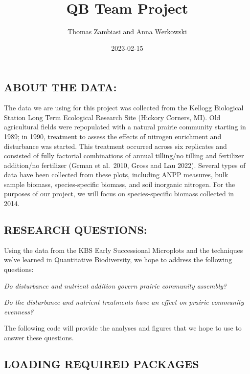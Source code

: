 \documentclass[
]{article}
\title{QB Team Project}
\author{Thomas Zambiasi and Anna Werkowski}
\date{2023-02-15}
\begin{document}
\maketitle

\hypertarget{about-the-data}{%
\subsection{ABOUT THE DATA:}\label{about-the-data}}

The data we are using for this project was collected from the Kellogg
Biological Station Long Term Ecological Research Site (Hickory Corners,
MI). Old agricultural fields were repopulated with a natural prairie
community starting in 1989; in 1990, treatment to assess the effects of
nitrogen enrichment and disturbance was started. This treatment occurred
across six replicates and consisted of fully factorial combinations of
annual tilling/no tilling and fertilizer addition/no fertilizer (Grman
et al.~2010, Gross and Lau 2022). Several types of data have been
collected from these plots, including ANPP measures, bulk sample
biomass, species-specific biomass, and soil inorganic nitrogen. For the
purposes of our project, we will focus on species-specific biomass
collected in 2014.

\hypertarget{research-questions}{%
\subsection{RESEARCH QUESTIONS:}\label{research-questions}}

Using the data from the KBS Early Successional Microplots and the
techniques we've learned in Quantitative Biodiversity, we hope to
address the following questions:

\emph{Do disturbance and nutrient addition govern prairie community
assembly?}

\emph{Do the disturbance and nutrient treatments have an effect on
prairie community evenness?}

The following code will provide the analyses and figures that we hope to
use to answer these questions.

\hypertarget{loading-required-packages}{%
\subsection{LOADING REQUIRED PACKAGES}\label{loading-required-packages}}
\end{document}

